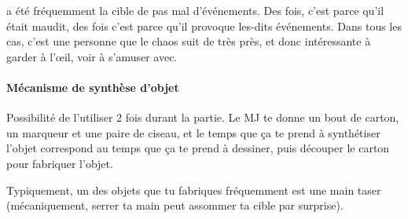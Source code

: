 {	\par \nmPlayerXI a été fréquemment la cible de pas mal d'événements. Des fois, c'est parce qu'il était maudit, des fois c'est parce qu'il provoque les-dits événements. Dans tous les cas, c'est une personne que le chaos suit de très près, et donc intéressante à garder à l'œil, voir à s'amuser avec.
	
	\paragraph{Mécanisme de synthèse d'objet} Possibilité de l'utiliser 2 fois durant la partie. Le MJ te donne un bout de carton, un marqueur et une paire de ciseau, et le temps que ça te prend à synthétiser l'objet correspond au temps que ça te prend à dessiner, puis découper le carton pour fabriquer l'objet.
	
	\par Typiquement, un des objets que tu fabriques fréquemment est une main taser (mécaniquement, serrer ta main peut assommer ta cible par surprise).
}



